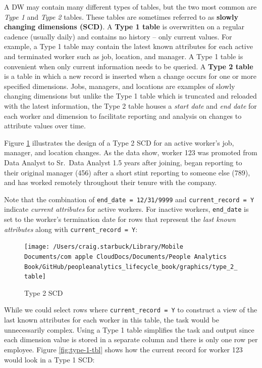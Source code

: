 \documentclass[]{book}
\begin{document}
A DW may contain many different types of tables, but the two most common are \emph{Type 1} and \emph{Type 2} tables. These tables are sometimes referred to as \textbf{slowly changing dimensions (SCD)}. A \textbf{Type 1 table} is overwritten on a regular cadence (usually daily) and contains no history -- only current values. For example, a Type 1 table may contain the latest known attributes for each active and terminated worker such as job, location, and manager. A Type 1 table is convenient when only current information needs to be queried. A \textbf{Type 2 table} is a table in which a new record is inserted when a change occurs for one or more specified dimensions. Jobs, managers, and locations are examples of slowly changing dimensions but unlike the Type 1 table which is truncated and reloaded with the latest information, the Type 2 table houses a \emph{start date} and \emph{end date} for each worker and dimension to facilitate reporting and analysis on changes to attribute values over time.

Figure \ref{fig:type-2-tbl} illustrates the design of a Type 2 SCD for an active worker's job, manager, and location changes. As the data show, worker 123 was promoted from Data Analyst to Sr.~Data Analyst 1.5 years after joining, began reporting to their original manager (456) after a short stint reporting to someone else (789), and has worked remotely throughout their tenure with the company.

Note that the combination of \texttt{end\_date\ =\ \textquotesingle{}12/31/9999\textquotesingle{}} and \texttt{current\_record\ =\ \textquotesingle{}Y\textquotesingle{}} indicate \emph{current attributes} for active workers. For inactive workers, \texttt{end\_date} is set to the worker's termination date for rows that represent the \emph{last known attributes} along with \texttt{current\_record\ =\ \textquotesingle{}Y\textquotesingle{}}:

\begin{figure}

{\centering \texttt{[image: /Users/craig.starbuck/Library/Mobile Documents/com~apple~CloudDocs/Documents/People Analytics Book/GitHub/peopleanalytics\_lifecycle\_book/graphics/type\_2\_table]} 

}

\caption{Type 2 SCD}\label{fig:type-2-tbl}
\end{figure}

While we could select rows where \texttt{current\_record\ =\ \textquotesingle{}Y\textquotesingle{}} to construct a view of the last known attributes for each worker in this table, the task would be unnecessarily complex. Using a Type 1 table simplifies the task and output since each dimension value is stored in a separate column and there is only one row per employee. Figure \ref{fig:type-1-tbl} shows how the current record for worker 123 would look in a Type 1 SCD:
\end{document}
